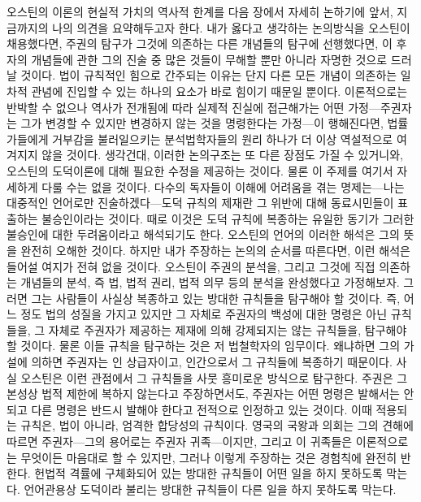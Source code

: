 오스틴의 이론의 현실적 가치의 역사적 한계를
다음 장에서 자세히 논하기에 앞서,
지금까지의 나의 의견을 요약해두고자 한다.
내가 옳다고 생각하는 논의방식을 오스틴이 채용했다면,
주권의 탐구가 그것에 의존하는 다른 개념들의 탐구에 선행했다면,
이 후자의 개념들에 관한 그의 진술 중 많은 것들이
무해할 뿐만 아니라 자명한 것으로 드러날 것이다.
법이 규칙적인 힘으로 간주되는 이유는 단지
다른 모든 개념이 의존하는 일차적 관념에 진입할 수 있는
하나의 요소가 바로 힘이기 때문일 뿐이다.
이론적으로는 반박할 수 없으나 역사가 전개됨에 따라 실제적 진실에 접근해가는
어떤 가정---주권자는 그가 변경할 수 있지만 변경하지 않는 것을
명령한다는 가정---이 행해진다면,
법률가들에게 거부감을 불러일으키는 분석법학자들의 원리 하나가
더 이상 역설적으로 여겨지지 않을 것이다.
생각건대, 이러한 논의구조는 또 다른 장점도 가질 수 있거니와,
오스틴의 도덕이론에 대해 필요한 수정을 제공하는 것이다.
물론 이 주제를 여기서 자세하게 다룰 수는 없을 것이다.
다수의 독자들이 이해에 어려움을 겪는 명제는---나는 대중적인 언어로만
진술하겠다---도덕 규칙의 제재란 그 위반에 대해 동료시민들이 표출하는
불승인이라는 것이다.
때로 이것은 도덕 규칙에 복종하는 유일한 동기가 그러한 불승인에 대한
두려움이라고 해석되기도 한다.
오스틴의 언어의 이러한 해석은 그의 뜻을 완전히 오해한 것이다.
하지만 내가 주장하는 논의의 순서를 따른다면,
이런 해석은 들어설 여지가 전혀 없을 것이다.
오스틴이 주권의 분석을, 그리고 그것에 직접 의존하는 개념들의 분석,
즉 법, 법적 권리, 법적 의무 등의 분석을 완성했다고 가정해보자.
그러면 그는 사람들이 사실상 복종하고 있는 방대한 규칙들을 탐구해야 할 것이다.
즉, 어느 정도 법의 성질을 가지고 있지만
그 자체로 주권자의 백성에 대한 명령은 아닌 규칙들을,
그 자체로 주권자가 제공하는 제재에 의해 강제되지는 않는 규칙들을,
탐구해야 할 것이다.
물론 이들 규칙을 탐구하는 것은 저 법철학자의 임무이다.
왜냐하면 그의 가설에 의하면 주권자는
인 상급자이고, 인간으로서 그 규칙들에 복종하기 때문이다.
사실 오스틴은 이런 관점에서
그 규칙들을
사뭇 흥미로운 방식으로
탐구한다.
주권은 그 본성상 법적 제한에 복하지 않는다고 주장하면서도,
주권자는 어떤 명령은 발해서는 안 되고 다른 명령은 반드시 발해야 한다고
전적으로 인정하고 있는 것이다.
이때 적용되는 규칙은, 법이 아니라, 엄격한 합당성의 규칙이다.
영국의 국왕과 의회는
그의 견해에 따르면
주권자---그의 용어로는 주권자 귀족---이지만,
그리고
이 귀족들은 이론적으로는 무엇이든 마음대로 할 수 있지만,
그러나
이렇게 주장하는 것은 경험칙에 완전히 반한다.
헌법적 격률에 구체화되어 있는 방대한 규칙들이 어떤 일을 하지 못하도록 막는다.
언어관용상 도덕이라 불리는 방대한 규칙들이 다른 일을 하지 못하도록 막는다.

